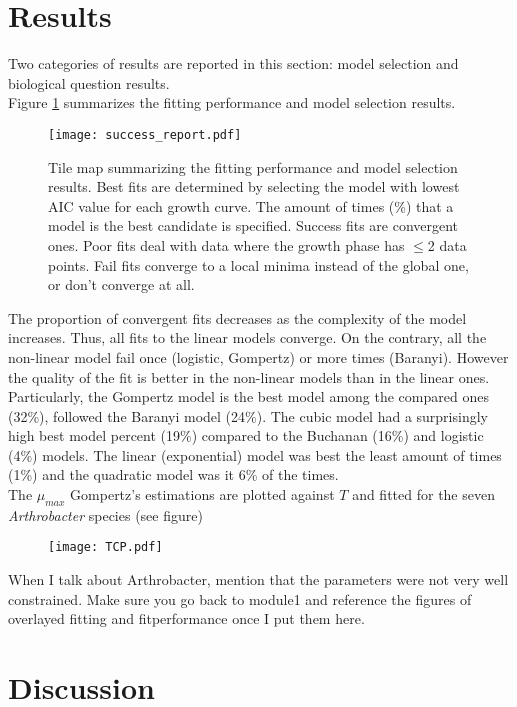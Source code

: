\documentclass[titlepage,11pt]{article}
\begin{document}
\begin{linenumbers}
	\section{Results}
	Two categories of results are reported in this section: model selection and biological question results. \\
	Figure \ref{success_report} summarizes the fitting performance and model selection results.
	\begin{figure}[h!]
		\texttt{[image: success\_report.pdf]}
		\centering
		\caption{Tile map summarizing the fitting performance and model selection results. Best fits are determined by selecting the model with lowest AIC value for each growth curve. The amount of times (\%) that a model is the best candidate is specified. Success fits are convergent ones. Poor fits deal with data where the growth phase has $ \leq $2 data points. Fail fits converge to a local minima instead of the global one, or don't converge at all.}
		\label{success_report}
	\end{figure}
	The proportion of convergent fits decreases as the complexity of the model increases. Thus, all fits to the linear models converge. On the contrary, all the non-linear model fail once (logistic, Gompertz) or more times (Baranyi). However the quality of the fit is better in the non-linear models than in the linear ones. Particularly, the Gompertz model is the best model among the compared ones (32\%), followed the Baranyi model (24\%). The cubic model had a surprisingly high best model percent (19\%) compared to the Buchanan (16\%) and logistic (4\%) models. The linear (exponential) model was best the least amount of times (1\%) and the quadratic model was it 6\% of the times.\\
	
	The $ \mu_{max} $  Gompertz's estimations are plotted against $ T $ and fitted for the seven \textit{Arthrobacter} species (see figure)
	\begin{figure}[h!]
		\texttt{[image: TCP.pdf]}
		\centering
		\caption{}
		\label{fig:TCP}
	\end{figure}
	When I talk about Arthrobacter, mention that the parameters were not very well constrained.
	Make sure you go back to module1 and reference the figures of overlayed fitting and fitperformance once I put them here.
	
	\section{Discussion}
	

\end{linenumbers}
\end{document}
